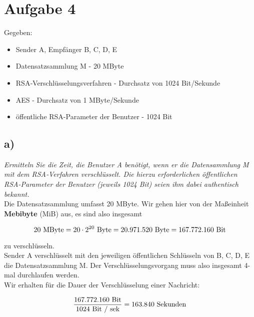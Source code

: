 \chapter{Aufgabe 4}

\noindent
Gegeben:

\begin{itemize}
    \item Sender A, Empfänger B, C, D, E
    \item Datensatzsammlung M - 20 MByte
    \item RSA‐Verschlüsselungsverfahren - Durchsatz von 1024 Bit/Sekunde
    \item AES - Durchsatz von 1 MByte/Sekunde
    \item öffentliche RSA-Parameter der Benutzer - 1024 Bit
\end{itemize}

\section{a)}
\textit{Ermitteln Sie die Zeit, die Benutzer A benötigt, wenn er die Datensammlung M
mit dem RSA‐Verfahren verschlüsselt. Die hierzu erforderlichen öffentlichen
RSA-Parameter der Benutzer (jeweils 1024 Bit) seien ihm dabei authentisch
bekannt.}\\

\noindent
Die Datensatzsammlung umfasst 20 MByte.
Wir gehen hier von der Maßeinheit \textbf{Mebibyte} (MiB) aus, es sind also insgesamt

\begin{equation}\notag
20 \ \text{MByte} = 20 \cdot 2^{20}\  \text{Byte} = 20.971.520\  \text{Byte} = 167.772.160\  \text{Bit}
\end{equation}

\noindent
zu verschlüsseln.\\

\noindent
Sender A verschlüsselt mit den jeweiligen öffentlichen Schlüsseln von B, C, D, E die Datensatzsammlung M.
Der Verschlüsselungsvorgang muss also insgesamt 4-mal durchlaufen werden. \\

\noindent
Wir erhalten für die Dauer der Verschlüsselung einer Nachricht:

\begin{equation}\notag
\frac{167.772.160\ \text{Bit}}{1024\ \text{Bit / sek}} = 163.840\ \text{Sekunden}
\end{equation}

\vspace{2mm}

